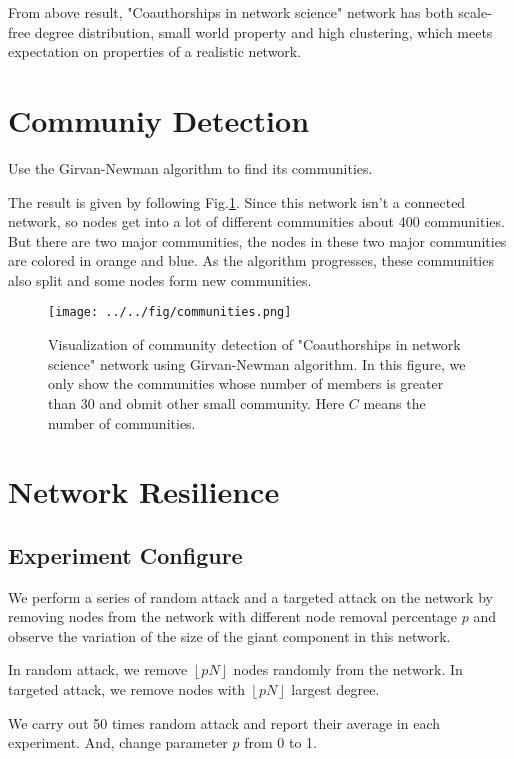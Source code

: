 \documentclass[runningheads]{llncs}
\begin{document}
From above result, "Coauthorships in network science" network has both scale-free degree distribution, small world property and high clustering, 
which meets expectation on properties of a realistic network.

\section{Communiy Detection}

Use the Girvan-Newman algorithm\cite{ref:gn-algo} to find its communities.

The result is given by following Fig.\ref{fig:community}. 
Since this network isn't a connected network, so nodes get into a lot of different communities about 400
communities. But there are two major communities, the nodes in these two major communities are colored in orange and blue.
As the algorithm progresses, these communities also split and some nodes form new communities.

\begin{figure}
    \centering
    \texttt{[image: ../../fig/communities.png]}
    \caption{Visualization of community detection of "Coauthorships in network science" network using Girvan-Newman algorithm. 
    In this figure, we only show the communities whose number of members is greater than 30 and obmit other small community. 
    Here $C$ means the number of communities.} 
    \label{fig:community}
\end{figure}

\section{Network Resilience}

\subsection{Experiment Configure}

We perform a series of random attack and a targeted attack on the network
by removing nodes from the network with different node removal percentage $p$
and observe the variation of the size of the giant component in this network.

In random attack, we remove $\left\lfloor p N\right\rfloor$ nodes randomly from the network.
In targeted attack, we remove nodes with $\left\lfloor p N\right\rfloor$ largest degree.

We carry out 50 times random attack and report their average in each experiment.
And, change parameter $p$ from 0 to 1.
\end{document}
